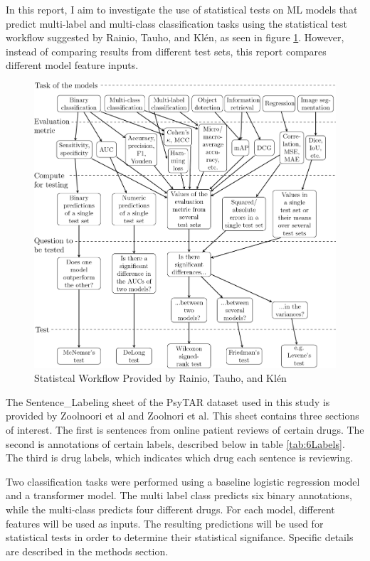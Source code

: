 \documentclass[10.7pt, onecolumn]{article}
\begin{document}
In this report, I aim to investigate the use of statistical tests on ML models that predict multi-label and multi-class  classification tasks using the statistical test workflow suggested by Rainio, Tauho, and Klén\cite{statsBased}, as seen in figure \ref{fig:statistical test workflow}. However, instead of comparing results from different test sets, this report compares different model feature inputs.

\begin{figure}[H]
  \centering
  \includegraphics[]{images/41598_2024_56706_Fig3_HTML.png}
  \caption{Statistcal Workflow Provided by Rainio, Tauho, and Klén\cite{statsBased}}
  \label{fig:statistical test workflow}
\end{figure}
 
The Sentence\_Labeling sheet of the PsyTAR dataset used in this study is provided by Zoolnoori et al\cite{psyTAR1} and Zoolnori et al\cite{psyTar2}. This sheet contains three sections of interest. The first is sentences from online patient reviews of certain drugs. The second is annotations of certain labels, described below in table \ref{tab:6Labels}. The third is drug labels, which indicates which drug each sentence is reviewing.

Two classification tasks were performed using a baseline logistic regression model and a transformer model. The multi label class predicts six binary annotations, while the multi-class predicts four different drugs. For each model, different features will be used as inputs. The resulting predictions will be used for statistical tests in order to determine their statistical signifance. Specific details are described in the methods section.
\end{document}
